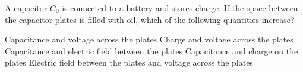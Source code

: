 \documentclass{../../../oss-classkick-exam}
\begin{document}
\begin{multicols*}{2}
\begin{questions}
    \question A capacitor $C_0$ is connected to a battery and stores charge. If
    the space between the capacitor plates is filled with oil, which of the
    following quantities increase?
    \begin{choices}
      \choice Capacitance and voltage across the plates
      \choice Charge and voltage across the plates
      \choice Capacitance and electric field between the plates
      \choice Capacitance and charge on the plates
      \choice Electric field between the plates and voltage across the plates
    \end{choices}
    \vspace{.7in}

%  
%  
%  

\end{questions}
\end{multicols*}
\end{document}
